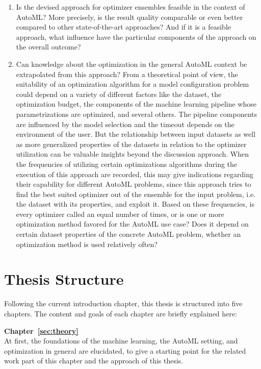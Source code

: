 \begin{enumerate}
    \item Is the devised approach for optimizer ensembles feasible in the context of AutoML?
    More precisely, is the result quality comparable or even better compared to other state-of-the-art approaches?
    And if it is a feasible approach, what influence have the particular components of the approach on the overall outcome?
    \item Can knowledge about the optimization in the general AutoML context be extrapolated from this approach?
    From a theoretical point of view, the suitability of an optimization algorithm for a model configuration problem could depend on a variety of different factors like the dataset, the optimization budget, the components of the machine learning pipeline whose parametrizations are optimized, and several others.
    The pipeline components are influenced by the model selection and the timeout depends on the environment of the user.
    But the relationship between input datasets as well as more generalized properties of the datasets in relation to the optimizer utilization can be valuable insights beyond the discussion approach.\newline
    When the frequencies of utilizing certain optimizations algorithms during the execution of this approach are recorded, this may give indications regarding their capability for different AutoML problems, since this approach tries to find the best suited optimizer out of the ensemble for the input problem, i.e. the dataset with its properties, and exploit it.
    Based on these frequencies, is every optimizer called an equal number of times, or is one or more optimization method favored for the AutoML use case?
    Does it depend on certain dataset properties of the concrete AutoML problem, whether an optimization method is used relatively often?
\end{enumerate}

\section{Thesis Structure}
\label{sec:intro:structure}
Following the current introduction chapter, this thesis is structured into five chapters.
The content and goals of each chapter are briefly explained here:

\textbf{Chapter~\ref{sec:theory}} \\[0.2em]
At first, the foundations of the machine learning, the AutoML setting, and optimization in general are elucidated, to give a starting point for the related work part of this chapter and the approach of this thesis.

